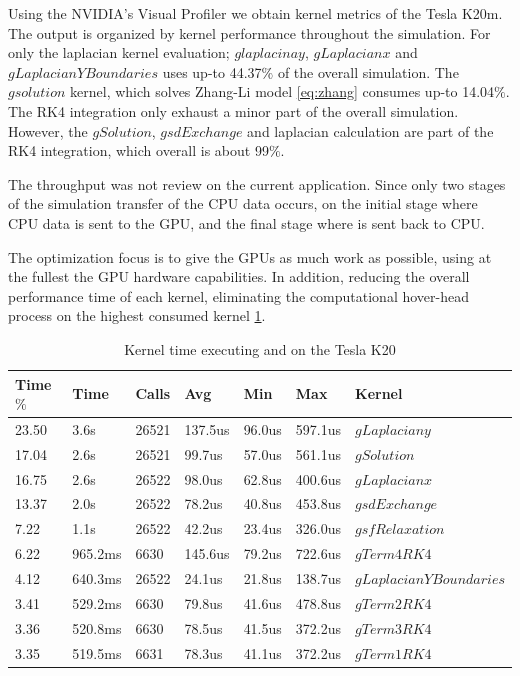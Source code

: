 Using the NVIDIA's Visual Profiler we obtain kernel metrics of the Tesla K20m. The output is organized by kernel performance throughout the  simulation. For only the laplacian kernel evaluation; $glaplacinay$, $gLaplacianx$ and  $gLaplacianYBoundaries$ uses up-to 44.37$\%$ of the overall simulation. The $gsolution$ kernel, which solves Zhang-Li model \ref{eq:zhang} consumes up-to 14.04$\%$. The RK4 integration only exhaust a minor part of the overall simulation. However, the $gSolution$, $gsdExchange$ and laplacian calculation are part of the RK4 integration, which overall is about 99$\%$.

The throughput was not review on the current application. Since only two stages of the simulation transfer of the CPU data occurs, on the initial stage where CPU data is sent to the GPU, and the final stage where is sent back to CPU.

 The optimization focus is to give the GPUs as much work as possible, using at the fullest the GPU hardware capabilities. In addition,  reducing the overall performance time of each kernel, eliminating the computational hover-head process on the highest consumed kernel \ref{tab:nvprof}.
 
\begin{table}[h]
\centering
  \begin{tabular} { | l | l | l | l | l | l | l |}
    \hline
    Time$\%$& Time & Calls & Avg & Min & Max & Kernel \\
    \hline
    23.50 & 3.6s & 26521 & 137.5us & 96.0us & 597.1us&$gLaplaciany$ \\
    \hline
    17.04 & 2.6s & 26521 & 99.7us & 57.0us & 561.1us&$gSolution$ \\
    \hline
    16.75 & 2.6s & 26522 & 98.0us & 62.8us & 400.6us&$gLaplacianx$ \\
     \hline
      13.37 & 2.0s & 26522 & 78.2us & 40.8us & 453.8us&$gsdExchange$\\
      \hline
    7.22 & 1.1s & 26522 & 42.2us & 23.4us & 326.0us &$gsfRelaxation$\\
       \hline
    6.22 & 965.2ms & 6630 & 145.6us & 79.2us & 722.6us &$gTerm4RK4$\\
       \hline
    4.12 & 640.3ms & 26522 & 24.1us & 21.8us  &138.7us &$gLaplacianYBoundaries$\\
       \hline
    3.41  & 529.2ms & 6630 & 79.8us & 41.6us  & 478.8us & $gTerm2RK4$\\
       \hline
    3.36 & 520.8ms & 6630 & 78.5us & 41.5us & 372.2us & $gTerm3RK4$\\
       \hline
    3.35 & 519.5ms & 6631 & 78.3us & 41.1us & 372.2us & $gTerm1RK4$ \\
   \hline
  \end{tabular}
  \caption{Kernel time executing and on the Tesla K20}
  \label{tab:nvprof}
  \end{table}
 
